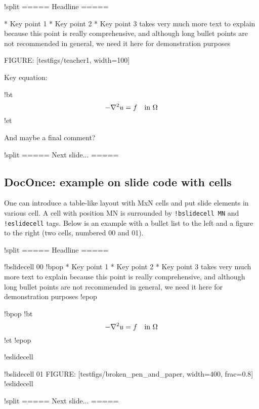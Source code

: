 \documentclass[%
oneside,                 %
final,                   %
10pt]{article}
\begin{document}
\bccq
!split
===== Headline =====

 * Key point 1
 * Key point 2
 * Key point 3 takes very much more text to explain because
   this point is really comprehensive, and although long
   bullet points are not recommended in general, we need
   it here for demonstration purposes

FIGURE: [testfigs/teacher1, width=100]

Key equation:

!bt
\[ -\nabla^2 u = f \quad\hbox{in }\Omega \]
!et

And maybe a final comment?

!split
===== Next slide... =====

\eccq


\subsection{DocOnce: example on slide code with cells}

One can introduce a table-like layout with MxN cells and
put slide elements in various cell. A cell with position
MN is surrounded by \Verb?!bslidecell MN? and \Verb?!eslidecell?
tags. Below is an example with a bullet list to the left and
a figure to the right (two cells, numbered 00 and 01).





























\bccq
!split
===== Headline =====

!bslidecell 00
!bpop
 * Key point 1
 * Key point 2
 * Key point 3 takes very much more text to explain because
   this point is really comprehensive, and although long
   bullet points are not recommended in general, we need
   it here for demonstration purposes
!epop

!bpop
!bt
\[ -\nabla^2 u = f \quad\hbox{in }\Omega \]
!et
!epop

!eslidecell

!bslidecell 01
FIGURE: [testfigs/broken_pen_and_paper, width=400, frac=0.8]
!eslidecell

!split
===== Next slide... =====

\eccq




\cleardoublepage{}  %
\printindex
\end{document}
